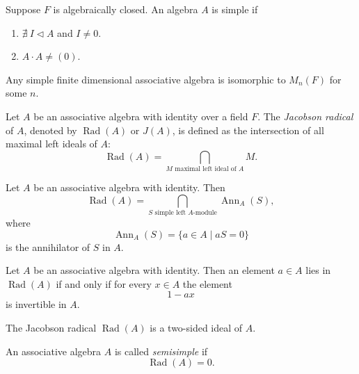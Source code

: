 \documentclass[11pt, a4paper]{report}
\begin{document}
\begin{definition} 
Suppose $ F $ is algebraically closed. An algebra $ A $ is simple if 
\begin{enumerate}
    \item $ \nexists \  I \triangleleft A $ and $ I \neq 0 $. 
    \item $ A\cdot  A \neq (0)$.   
\end{enumerate}
\end{definition}

\begin{corollary}
Any simple finite dimensional associative algebra is isomorphic to $ M_n(F) $ for some $ n $.
\end{corollary}

\begin{definition}
    Let $A$ be an associative algebra with identity over a field $F$.
    The \emph{Jacobson radical} of $A$, denoted by $\operatorname{Rad}(A)$
    or $J(A)$, is defined as the intersection of all maximal left ideals of $A$:
    \[
    \operatorname{Rad}(A)
    =
    \bigcap_{M \text{ maximal left ideal of } A} M.
    \]
    \end{definition}
    
    
    \begin{proposition}
    Let $A$ be an associative algebra with identity. Then
    \[
    \operatorname{Rad}(A)
    =
    \bigcap_{S \text{ simple left } A\text{-module}}
    \operatorname{Ann}_A(S),
    \]
    where
    \[
    \operatorname{Ann}_A(S)
    =
    \{a\in A \mid aS=0\}
    \]
    is the annihilator of $S$ in $A$.
    \end{proposition}
    
    
    \begin{proposition}
    Let $A$ be an associative algebra with identity.
    Then an element $a\in A$ lies in $\operatorname{Rad}(A)$
    if and only if for every $x\in A$ the element
    \[
    1-ax
    \]
    is invertible in $A$.
    \end{proposition}
    
    
    \begin{proposition}
    The Jacobson radical $\operatorname{Rad}(A)$ is a two-sided ideal of $A$.
    \end{proposition}
    
    
    \begin{definition}
    An associative algebra $A$ is called \emph{semisimple} if
    \[
    \operatorname{Rad}(A)=0.
    \]
    \end{definition}
\end{document}
